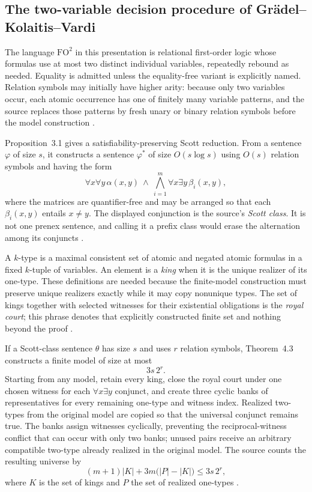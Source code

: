 
\subsection{The two-variable decision procedure of Gr\"adel--Kolaitis--Vardi}
\label{sec:p09-presentation-n-c-006}

The language \(\mathrm{FO}^2\) in this presentation is relational first-order
logic whose formulas use at most two distinct individual variables, repeatedly
rebound as needed.  Equality is admitted unless the equality-free variant is
explicitly named.  Relation symbols may initially have higher arity: because
only two variables occur, each atomic occurrence has one of finitely many
variable patterns, and the source replaces those patterns by fresh unary or
binary relation symbols before the model construction
\cite[pp.~53--58]{GradelKolaitisVardi1997}.

Proposition~3.1 gives a satisfiability-preserving Scott reduction.  From a
sentence \(\varphi\) of size \(s\), it constructs a sentence \(\varphi^*\) of
size \(O(s\log s)\) using \(O(s)\) relation symbols and having the form
\[
 \forall x\forall y\,\alpha(x,y)
 \ \land\
 \bigwedge_{i=1}^{m}\forall x\exists y\,\beta_i(x,y),
\]
where the matrices are quantifier-free and may be arranged so that each
\(\beta_i(x,y)\) entails \(x\neq y\).  The displayed conjunction is the
source's \emph{Scott class}.  It is not one prenex sentence, and calling it a
prefix class would erase the alternation among its conjuncts
\cite[prop.~3.1 and pp.~58--60]{GradelKolaitisVardi1997}.

A \(k\)-type is a maximal consistent set of atomic and negated atomic formulas
in a fixed \(k\)-tuple of variables.  An element is a \emph{king} when it is
the unique realizer of its one-type.  These definitions are needed because the
finite-model construction must preserve unique realizers exactly while it may
copy nonunique types.  The set of kings together with selected witnesses for
their existential obligations is the \emph{royal court}; this phrase denotes
that explicitly constructed finite set and nothing beyond the proof
\cite[defs.~4.1--4.2]{GradelKolaitisVardi1997}.

If a Scott-class sentence \(\theta\) has size \(s\) and uses \(r\) relation
symbols, Theorem~4.3 constructs a finite model of size at most
\[
 3s\,2^r.
\]
Starting from any model, retain every king, close the royal court under one
chosen witness for each \(\forall x\exists y\) conjunct, and create three
cyclic banks of representatives for every remaining one-type and witness
index.  Realized two-types from the original model are copied so that the
universal conjunct remains true.  The banks assign witnesses cyclically,
preventing the reciprocal-witness conflict that can occur with only two banks;
unused pairs receive an arbitrary compatible two-type already realized in the
original model.  The source counts the resulting universe by
\[
 (m+1)\lvert K\rvert
 +3m\bigl(\lvert P\rvert-\lvert K\rvert\bigr)
 \leq 3s\,2^r,
\]
where \(K\) is the set of kings and \(P\) the set of realized one-types
\cite[pp.~60--64]{GradelKolaitisVardi1997}.

